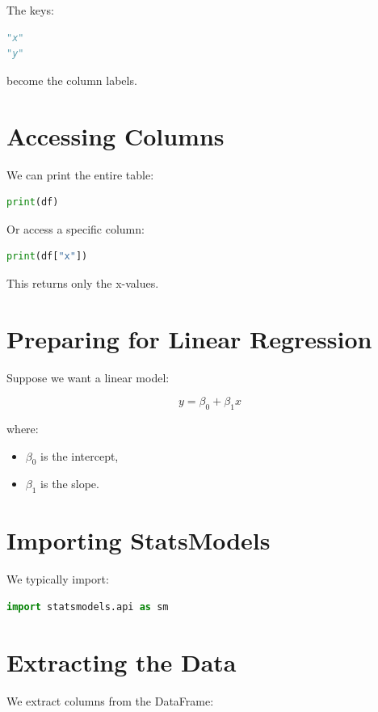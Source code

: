 \documentclass[11pt]{article}
\begin{document}
The keys:

\begin{lstlisting}[language=Python]
"x"
"y"
\end{lstlisting}

become the column labels.

\section{Accessing Columns}

We can print the entire table:

\begin{lstlisting}[language=Python]
print(df)
\end{lstlisting}

Or access a specific column:

\begin{lstlisting}[language=Python]
print(df["x"])
\end{lstlisting}

This returns only the x-values.

\section{Preparing for Linear Regression}

Suppose we want a linear model:

\[
y = \beta_0 + \beta_1 x
\]

where:

\begin{itemize}
    \item \(\beta_0\) is the intercept,
    \item \(\beta_1\) is the slope.
\end{itemize}

\section{Importing StatsModels}

We typically import:

\begin{lstlisting}[language=Python]
import statsmodels.api as sm
\end{lstlisting}

\section{Extracting the Data}

We extract columns from the DataFrame:
\end{document}
